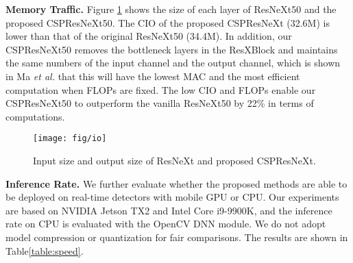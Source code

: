 \documentclass{article}
\begin{document}
{\bf Memory Traffic.} Figure \ref{fig:io} shows the size of each layer of ResNeXt50 and the proposed CSPResNeXt50.  The CIO of the proposed CSPResNeXt (32.6M) is lower than that of the original ResNeXt50 (34.4M). In addition, our CSPResNeXt50 removes the bottleneck layers in the ResXBlock and maintains the same numbers of the input channel and the output channel, which is shown in Ma \textit{et al.} \cite{ma2018shufflenetv2} that this will have the lowest MAC and the most efficient computation when FLOPs are fixed. The low CIO and FLOPs enable our CSPResNeXt50 to outperform the vanilla ResNeXt50 by 22\% in terms of computations.

\vspace*{1mm}

\begin{figure}[h]
	\begin{center}
		\texttt{[image: fig/io]}
	\end{center}
	\caption{Input size and output size of ResNeXt and proposed CSPResNeXt. }
	\label{fig:io}
\end{figure}

{\bf Inference Rate.} We further evaluate whether the proposed methods are able to be deployed on real-time detectors with mobile GPU or CPU. Our experiments are based on NVIDIA Jetson TX2 and Intel Core i9-9900K, and the inference rate on CPU is evaluated with the OpenCV DNN module. We do not adopt model compression or quantization for fair comparisons. The results are shown in Table\ref{table:speed}.
\end{document}
